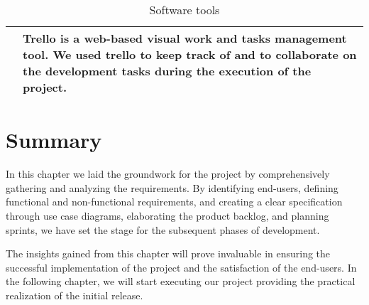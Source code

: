 \begin{table}[hbt!]
\begin{tabular}{ | m{} | m{} | }
            \hline
            \centering    & Trello is a web-based visual work and tasks management tool. We used trello to keep track of and to collaborate on the development tasks during the execution of the project.                                                                                                                                                  \\
            \hline
      \end{tabular}
      \caption{Software tools}
      \label{tools}
\end{table}

\pagebreak
{}
\section*{Summary}
In this chapter we laid the groundwork for the project by comprehensively gathering and analyzing
the requirements. By identifying end-users, defining functional and non-functional requirements,
and creating a clear specification through use case diagrams, elaborating the product backlog,
and planning sprints, we have set the stage for the subsequent phases of development.

The insights gained from this chapter will prove invaluable in ensuring the successful implementation
of the project and the satisfaction of the end-users. In the following chapter, we will start executing
our project providing the practical realization of the initial release.
